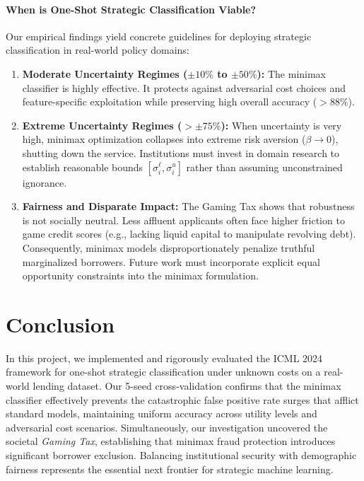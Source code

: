 \documentclass[10pt, letterpaper]{article}
\begin{document}
\paragraph{When is One-Shot Strategic Classification Viable?}
Our empirical findings yield concrete guidelines for deploying strategic classification in real-world policy domains:
\begin{enumerate}[leftmargin=*]
    \item \textbf{Moderate Uncertainty Regimes ($\pm 10\%$ to $\pm 50\%$):} The minimax classifier is highly effective. It protects against adversarial cost choices and feature-specific exploitation while preserving high overall accuracy ($>88\%$).
    \item \textbf{Extreme Uncertainty Regimes ($> \pm 75\%$):} When uncertainty is very high, minimax optimization collapses into extreme risk aversion ($\beta \to 0$), shutting down the service. Institutions must invest in domain research to establish reasonable bounds $[\sigma_i^\ell, \sigma_i^u]$ rather than assuming unconstrained ignorance.
    \item \textbf{Fairness and Disparate Impact:} The Gaming Tax shows that robustness is not socially neutral. Less affluent applicants often face higher friction to game credit scores (e.g., lacking liquid capital to manipulate revolving debt). Consequently, minimax models disproportionately penalize truthful marginalized borrowers. Future work must incorporate explicit equal opportunity constraints \cite{hardt2016equality} into the minimax formulation.
\end{enumerate}

\section{Conclusion}
\label{sec:conclusion}

In this project, we implemented and rigorously evaluated the ICML 2024 framework for one-shot strategic classification under unknown costs on a real-world lending dataset. Our 5-seed cross-validation confirms that the minimax classifier effectively prevents the catastrophic false positive rate surges that afflict standard models, maintaining uniform accuracy across utility levels and adversarial cost scenarios. Simultaneously, our investigation uncovered the societal \emph{Gaming Tax}, establishing that minimax fraud protection introduces significant borrower exclusion. Balancing institutional security with demographic fairness represents the essential next frontier for strategic machine learning.
\end{document}
